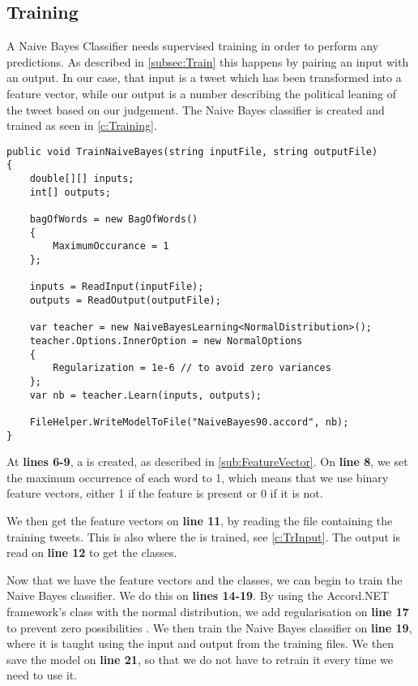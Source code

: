 \subsection{Training}
A Naive Bayes Classifier needs supervised training in order to perform any
predictions. As described in \autoref{subsec:Train} this happens by pairing an
input with an output. In our case, that input is a tweet which has been
transformed into a feature vector, while our output is a number describing the political
leaning of the tweet based on our judgement. The Naive Bayes classifier is
created and trained as seen in \autoref{c:Training}.\nl

\begin{minipage}[H]{\linewidth}
\begin{lstlisting}[caption = Creating and training the classifier., label =
c:Training] 
public void TrainNaiveBayes(string inputFile, string outputFile)
{
    double[][] inputs;
    int[] outputs;

    bagOfWords = new BagOfWords()
    {
        MaximumOccurance = 1
    };

    inputs = ReadInput(inputFile);
    outputs = ReadOutput(outputFile);

    var teacher = new NaiveBayesLearning<NormalDistribution>();
    teacher.Options.InnerOption = new NormalOptions
    {
        Regularization = 1e-6 // to avoid zero variances
    };
    var nb = teacher.Learn(inputs, outputs);

    FileHelper.WriteModelToFile("NaiveBayes90.accord", nb);
}
\end{lstlisting}
\end{minipage}

At \textbf{lines 6-9}, a  is created, as described in
\autoref{sub:FeatureVector}. On \textbf{line 8}, we set the maximum occurrence
of each word to 1, which means that we use binary feature vectors, either 1 if
the feature is present or 0 if it is not.

We then get the feature vectors on \textbf{line 11}, by reading the file
containing the training tweets. This is also where the  is
trained, see \autoref{c:TrInput}. The output is read on \textbf{line 12} to get
the classes.

Now that we have the feature vectors and the classes, we can begin to train the
Naive Bayes classifier. We do this on \textbf{lines 14-19}. By using the
Accord.NET framework's  class with the normal
distribution, we add regularisation on \textbf{line 17} to prevent zero
possibilities \citep[p. 312]{MIBook}. We then train the Naive Bayes classifier
on \textbf{line 19}, where it is taught using the input and output from the
training files. We then save the model on \textbf{line 21}, so that we do not
have to retrain it every time we need to use it.\nl

